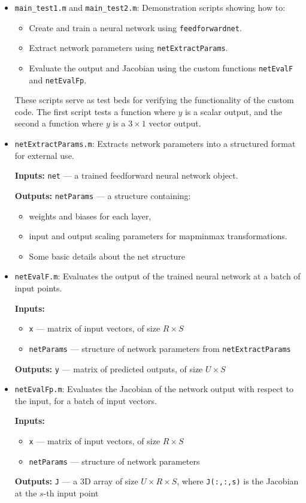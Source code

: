 \documentclass[a4paper,12pt]{article}
\newcommand{\code}[1]{\texttt{#1}}
\begin{document}
\begin{itemize}
  \item \code{main\_test1.m} and \code{main\_test2.m}:  
  Demonstration scripts showing how to:
  \begin{itemize}
    \item Create and train a neural network using \code{feedforwardnet}.
    \item Extract network parameters using \code{netExtractParams}.
    \item Evaluate the output and Jacobian using the custom functions \code{netEvalF} and \code{netEvalFp}.
  \end{itemize}
  These scripts serve as test beds for verifying the functionality of the custom code. The first script tests a function where $y$ is a scalar output, and the second a function where $y$ is a $3\times1$ vector output.

  \item \code{netExtractParams.m}:  
  Extracts network parameters into a structured format for external use.

  \textbf{Inputs:} \code{net} — a trained feedforward neural network object.

  \textbf{Outputs:} \code{netParams} — a structure containing:
  \begin{itemize}
    \item weights and biases for each layer,
    \item input and output scaling parameters for mapminmax transformations.
    \item Some basic details about the net structure
  \end{itemize}

  \item \code{netEvalF.m}:  
  Evaluates the output of the trained neural network at a batch of input points.

  \textbf{Inputs:}
  \begin{itemize}
    \item \code{x} — matrix of input vectors, of size \( R \times S \)
    \item \code{netParams} — structure of network parameters from \code{netExtractParams}
  \end{itemize}

  \textbf{Outputs:} \code{y} — matrix of predicted outputs, of size \( U \times S \)

  \item \code{netEvalFp.m}:  
  Evaluates the Jacobian of the network output with respect to the input, for a batch of input vectors.

  \textbf{Inputs:}
  \begin{itemize}
    \item \code{x} — matrix of input vectors, of size \( R \times S \)
    \item \code{netParams} — structure of network parameters
  \end{itemize}

  \textbf{Outputs:} \code{J} — a 3D array of size \( U \times R \times S \), where \code{J(:,:,s)} is the Jacobian at the \( s \)-th input point
\end{itemize}
\end{document}

